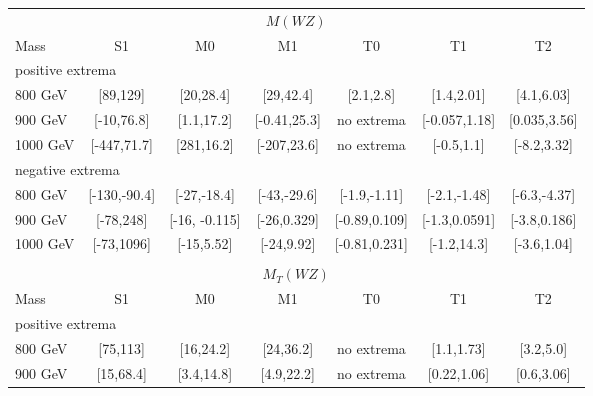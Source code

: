 \documentclass[../Bachelorarbeit.tex]{subfiles}
\begin{document}
\begin{table}[h]
    \centering
    \begin{tabular}{ l c c c c c c }
        \multicolumn{7}{c}{ $M(WZ)$ }                                                                            \\
        Mass     & S1           & M0            & M1           & T0              & T1            & T2            \\
        \hline
        \multicolumn{7}{l}{ positive extrema }                                                                   \\
        800 GeV  & [89,129]     & [20,28.4]     & [29,42.4]    & [2.1,2.8]       & [1.4,2.01]    & [4.1,6.03]    \\
        900 GeV  & [-10,76.8]   & [1.1,17.2]    & [-0.41,25.3] & no extrema      & [-0.057,1.18] & [0.035,3.56]  \\
        1000 GeV & [-447,71.7]  & [281,16.2]    & [-207,23.6]  & no extrema      & [-0.5,1.1]    & [-8.2,3.32]   \\
        \multicolumn{7}{l}{ negative extrema }                                                                   \\
        800 GeV  & [-130,-90.4] & [-27,-18.4]   & [-43,-29.6]  & [-1.9,-1.11]    & [-2.1,-1.48]  & [-6.3,-4.37]  \\
        900 GeV  & [-78,248]    & [-16, -0.115] & [-26,0.329]  & [-0.89,0.109]   & [-1.3,0.0591] & [-3.8,0.186]  \\
        1000 GeV & [-73,1096]   & [-15,5.52]    & [-24,9.92]   & [-0.81,0.231]   & [-1.2,14.3]   & [-3.6,1.04]   \\
        \hline
        \multicolumn{7}{c}{}                                                                                     \\
        \multicolumn{7}{c}{ $M_{T}(WZ)$ }                                                                        \\
        Mass     & S1           & M0            & M1           & T0              & T1            & T2            \\
        \hline
        \multicolumn{7}{l}{ positive extrema }                                                                   \\
        800 GeV  & [75,113]     & [16,24.2]     & [24,36.2]    & no extrema      & [1.1,1.73]    & [3.2,5.0]     \\
        900 GeV  & [15,68.4]    & [3.4,14.8]    & [4.9,22.2]   & no extrema      & [0.22,1.06]   & [0.6,3.06]    \\

\end{tabular}
\end{table}
\end{document}
